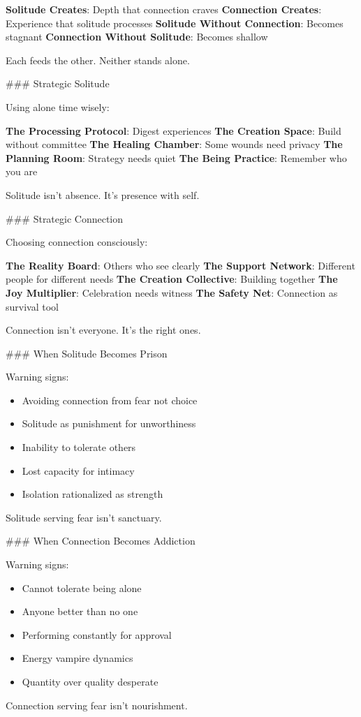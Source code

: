 \documentclass[12pt]{book}
\begin{document}
\textbf{Solitude Creates}: Depth that connection craves
\textbf{Connection Creates}: Experience that solitude processes
\textbf{Solitude Without Connection}: Becomes stagnant
\textbf{Connection Without Solitude}: Becomes shallow

Each feeds the other. Neither stands alone.

\#\#\# Strategic Solitude

Using alone time wisely:

\textbf{The Processing Protocol}: Digest experiences
\textbf{The Creation Space}: Build without committee
\textbf{The Healing Chamber}: Some wounds need privacy
\textbf{The Planning Room}: Strategy needs quiet
\textbf{The Being Practice}: Remember who you are

Solitude isn't absence. It's presence with self.

\#\#\# Strategic Connection

Choosing connection consciously:

\textbf{The Reality Board}: Others who see clearly
\textbf{The Support Network}: Different people for different needs
\textbf{The Creation Collective}: Building together
\textbf{The Joy Multiplier}: Celebration needs witness
\textbf{The Safety Net}: Connection as survival tool

Connection isn't everyone. It's the right ones.

\#\#\# When Solitude Becomes Prison

Warning signs:
\begin{itemize}
\item Avoiding connection from fear not choice
\item Solitude as punishment for unworthiness
\item Inability to tolerate others
\item Lost capacity for intimacy
\item Isolation rationalized as strength

\end{itemize}
Solitude serving fear isn't sanctuary.

\#\#\# When Connection Becomes Addiction

Warning signs:
\begin{itemize}
\item Cannot tolerate being alone
\item Anyone better than no one
\item Performing constantly for approval
\item Energy vampire dynamics
\item Quantity over quality desperate

\end{itemize}
Connection serving fear isn't nourishment.
\end{document}
